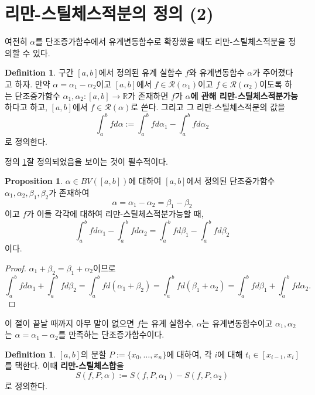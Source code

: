 \documentclass[11pt]{book}
\numberwithin{equation}{chapter}
\def\RR{\mathbb{R}}
\def\calR{\mathcal{R}}
\theoremstyle{definition}
\newtheorem{prop}[thm]{Proposition}
\newtheorem{defn}[thm]{Definition}
\begin{document}
\section{리만-스틸체스적분의 정의 (2)}

여전히 \(\alpha\)를 단조증가함수에서 유계변동함수로 확장했을 때도 리만-스틸체스적분을 정의할 수 있다.

\begin{defn} \label{9.6.1}
   구간 \([a, b]\)에서 정의된 유계 실함수 \(f\)와 유계변동함수 \(\alpha\)가 주어졌다고 하자. 만약 \(\alpha = \alpha_1 - \alpha_2\)이고 \([a, b]\)에서 \(f \in \calR(\alpha_1)\)이고 \(f \in \calR(\alpha_2)\)이도록 하는 단조증가함수 \(\alpha_1, \alpha_2 : [a, b] \to \RR\)가 존재하면 \(f\)가 \textbf{\(\alpha\)에 관해 리만-스틸체스적분가능}하다고 하고, \([a, b]\)에서 \(f \in \calR(\alpha)\)로 쓴다. 그리고 그 리만-스틸체스적분의 값을
   \[
        \int_a^b f d\alpha := \int_a^b f d\alpha_1 - \int_a^b f d\alpha_2
   \]
   로 정의한다.
\end{defn}

정의 \ref{9.6.1}\이 잘 정의되었음을 보이는 것이 필수적이다.

\begin{prop}
    \(\alpha \in BV([a, b])\)에 대하여 \([a, b]\)에서 정의된 단조증가함수 \(\alpha_1, \alpha_2, \beta_1, \beta_2\)가 존재하여
    \[
        \alpha = \alpha_1 - \alpha_2 = \beta_1 - \beta_2
    \]
    이고 \(f\)가 이들 각각에 대하여 리만-스틸체스적분가능할 때,
    \[
        \int_a^b f d\alpha_1 - \int_a^b f d\alpha_2 = \int_a^b f d\beta_1 - \int_a^b f d\beta_2
    \]
    이다.
\end{prop}
\begin{proof}
    \(\alpha_1 + \beta_2 = \beta_1 + \alpha_2\)이므로 
    \[
        \int_a^b f d\alpha_1 + \int_a^b f d\beta_2 = \int_a^b f d(\alpha_1 + \beta_2) = \int_a^b f d(\beta_1 + \alpha_2) = \int_a^b f d\beta_1 + \int_a^b f d\alpha_2.
    \]
\end{proof}

이 절이 끝날 때까지 아무 말이 없으면 \(f\)는 유계 실함수, \(\alpha\)는 유계변동함수이고 \(\alpha_1, \alpha_2\)는 \(\alpha = \alpha_1 - \alpha_2\)를 만족하는 단조증가함수이다.

\begin{defn}
    \([a, b]\)의 분할 \(P := \{x_0, \ldots, x_n\}\)에 대하여, 각 \(i\)에 대해 \(t_i \in [x_{i-1}, x_i]\)를 택한다. 이때 \textbf{리만-스틸체스합}을
    \[
        S(f, P, \alpha) := S(f, P, \alpha_1) - S(f, P, \alpha_2)
    \]
    로 정의한다.
\end{defn}
\end{document}
